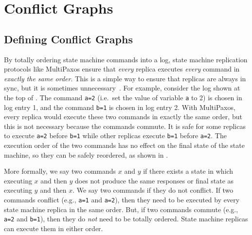 \section{Conflict Graphs}
\subsection{Defining Conflict Graphs}
By totally ordering state machine commands into a log, state machine
replication protocols like MultiPaxos ensure that \emph{every} replica executes
\emph{every} command in \emph{exactly the same order}. This is a simple way to
ensure that replicas are always in sync, but it is sometimes
unnecessary~\cite{lamport2005generalized}. For example, consider the log shown
at the top of . The command \texttt{a=2} (i.e.\ set the
value of variable \texttt{a} to 2) is chosen in log entry 1, and the command
\texttt{b=1} is chosen in log entry 2. With MultiPaxos, every replica would
execute these two commands in exactly the same order, but this is not necessary
because the commands commute. It is safe for some replicas to execute
\texttt{a=2} before \texttt{b=1} while other replicas execute \texttt{b=1}
before \texttt{a=2}. The execution order of the two commands has no effect on
the final state of the state machine, so they can be safely reordered, as shown
in .

{}

More formally, we say two commands $x$ and $y$  if there
exists a state in which executing $x$ and then $y$ does not produce the same
responses or final state as executing $y$ and then $x$. We say two commands
 if they do not conflict. If two commands conflict (e.g.,
\texttt{a=1} and \texttt{a=2}), then they need to be executed by every state
machine replica in the same order. But, if two commands commute (e.g.,
\texttt{a=2} and \texttt{b=1}), then they do \emph{not} need to be totally
ordered. State machine replicas can execute them in either order.

